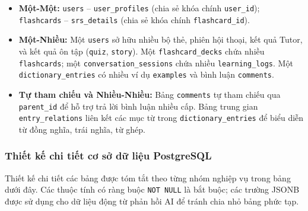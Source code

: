 \documentclass[../DoAn.tex]{subfiles}
\begin{document}
\begin{itemize}
    \item \textbf{Một-Một:} \texttt{users} -- \texttt{user\_profiles} (chia sẻ khóa chính \texttt{user\_id}); \texttt{flashcards} -- \texttt{srs\_details} (chia sẻ khóa chính \texttt{flashcard\_id}).
    \item \textbf{Một-Nhiều:} Một \texttt{users} sở hữu nhiều bộ thẻ, phiên hội thoại, kết quả Tutor, và kết quả ôn tập (\texttt{quiz}, \texttt{story}). Một \texttt{flashcard\_decks} chứa nhiều \texttt{flashcards}; một \texttt{conversation\_sessions} chứa nhiều \texttt{learning\_logs}. Một \texttt{dictionary\_entries} có nhiều ví dụ \texttt{examples} và bình luận \texttt{comments}.
    \item \textbf{Tự tham chiếu và Nhiều-Nhiều:} Bảng \texttt{comments} tự tham chiếu qua \texttt{parent\_id} để hỗ trợ trả lời bình luận nhiều cấp. Bảng trung gian \texttt{entry\_relations} liên kết các mục từ trong \texttt{dictionary\_entries} để biểu diễn từ đồng nghĩa, trái nghĩa, từ ghép.
\end{itemize}

\subsubsection{Thiết kế chi tiết cơ sở dữ liệu PostgreSQL}

Thiết kế chi tiết các bảng được tóm tắt theo từng nhóm nghiệp vụ trong bảng dưới đây. Các thuộc tính có ràng buộc \texttt{NOT NULL} là bắt buộc; các trường JSONB được sử dụng cho dữ liệu động từ phản hồi AI để tránh chia nhỏ bảng phức tạp.
\end{document}
